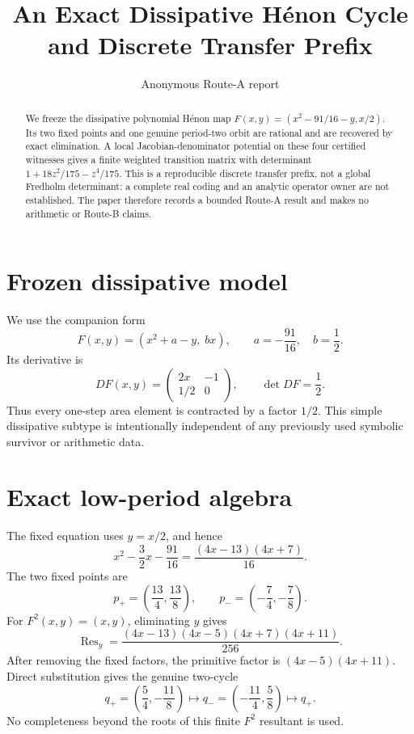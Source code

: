 \documentclass[10pt]{article}
\title{An Exact Dissipative H\'enon Cycle and Discrete Transfer Prefix}
\author{Anonymous Route-A report}
\date{}
\begin{document}
\maketitle

\begin{abstract}
We freeze the dissipative polynomial H\'enon map
\(F(x,y)=(x^2-91/16-y,x/2)\).  Its two fixed points and one genuine
period-two orbit are rational and are recovered by exact elimination.  A
local Jacobian-denominator potential on these four certified witnesses gives
a finite weighted transition matrix with determinant
\(1+18z^2/175-z^4/175\).  This is a reproducible discrete transfer prefix,
not a global Fredholm determinant: a complete real coding and an analytic
operator owner are not established.  The paper therefore records a bounded
Route-A result and makes no arithmetic or Route-B claims.
\end{abstract}

\section{Frozen dissipative model}
We use the companion form
\[
 F(x,y)=\left(x^2+a-y,\;bx\right),
 \qquad a=-\frac{91}{16},\quad b=\frac12.
\]
Its derivative is
\[
 DF(x,y)=\begin{pmatrix}2x&-1\\[1pt]1/2&0\end{pmatrix},
 \qquad \det DF=\frac12.
\]
Thus every one-step area element is contracted by a factor $1/2$.  This
simple dissipative subtype is intentionally independent of any previously
used symbolic survivor or arithmetic data.

\section{Exact low-period algebra}
The fixed equation uses $y=x/2$, and hence
\[
 x^2-\frac32x-\frac{91}{16}
 =\frac{(4x-13)(4x+7)}{16}.
\]
The two fixed points are
\[
 p_+=\left(\frac{13}{4},\frac{13}{8}\right),
 \qquad
 p_- =\left(-\frac74,-\frac78\right).
\]
For $F^2(x,y)=(x,y)$, eliminating $y$ gives
\[
 \operatorname{Res}_y
 =\frac{(4x-13)(4x-5)(4x+7)(4x+11)}{256}.
\]
After removing the fixed factors, the primitive factor is
$(4x-5)(4x+11)$.  Direct substitution gives the genuine two-cycle
\[
 q_+=\left(\frac54,-\frac{11}{8}\right)
 \longmapsto
 q_- =\left(-\frac{11}{4},\frac58\right)
 \longmapsto q_+.
\]
No completeness beyond the roots of this finite $F^2$ resultant is used.
\end{document}
